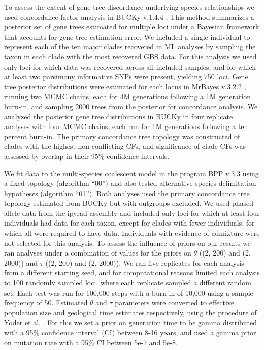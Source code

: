 \documentclass[10pt,letterpaper]{article}
\begin{document}
To assess the extent of gene tree discordance underlying species relationships we used concordance factor analysis in BUCKy v.1.4.4 \cite{larget_bucky:_2010}. This method summarizes a posterior set of gene trees estimated for multiple loci under a Bayesian framework that accounts for gene tree estimation error. We included a single individual to represent each of the ten major clades recovered in ML analyses by sampling the taxon in each clade with the most recovered GBS data. For this analysis we used only loci for which data was recovered across all included samples, and for which at least two parsimony informative SNPs were present, yielding 750 loci. Gene tree posterior distributions were estimated for each locus in MrBayes v.3.2.2 \cite{ronquist_mrbayes_2012}, running two MCMC chains, each for 4M generations following a 1M generation burn-in, and sampling 2000 trees from the posterior for concordance analysis. We analyzed the posterior gene tree distributions in BUCKy in four replicate analyses with four MCMC chains, each run for 1M generations following a ten percent burn-in. The primary concordance tree topology was constructed of clades with the highest non-conflicting CFs, and significance of clade CFs was assessed by overlap in their 95\% confidence intervals. 
 
We fit data to the multi-species coalescent model in the program BPP v.3.3 \cite{yang_bpp_2015} using a fixed topology (algorithm “00”) and also tested alternative species delimitation hypotheses (algorithm “01”). Both analyses used the primary concordance tree topology estimated from BUCKy but with outgroups excluded. We used phased allele data from the ipyrad assembly and included only loci for which at least four individuals had data for each taxon, except for clades with fewer individuals, for which all were required to have data. Individuals with evidence of admixture were not selected for this analysis. To assess the influence of priors on our results we ran analyses under a combination of values for the priors on $\theta$ ((2, 200) and (2, 2000)) and $\tau$ ((2, 200) and (2, 2000)). We ran five replicates for each analysis from a different starting seed, and for computational reasons limited each analysis to 100 randomly sampled loci, where each replicate sampled a different random set. Each test was run for 100,000 steps with a burn-in of 10,000 using a sample frequency of 50. Estimated $\theta$ and $\tau$ parameters were converted to effective population size and geological time estimates respectively, using the procedure of Yoder et al. \cite{yoder_geogenetic_2016}. For this we set a prior on generation time to be gamma distributed with a 95\% confidence interval (CI) between 8-16 years, and used a gamma prior on mutation rate with a 95\% CI between 5e-7 and 5e-8.  
\end{document}
